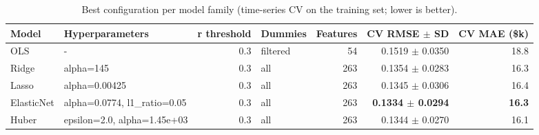 \begin{table}[t]
\centering
\small
\begin{tabular}{llrlrrr}
\toprule
Model & Hyperparameters & r threshold & Dummies & Features & CV RMSE $\pm$ SD & CV MAE (\$k) \\
\midrule
OLS & - & 0.3 & filtered & 54 & 0.1519 $\pm$ 0.0350 & 18.8 \\
Ridge & alpha=145 & 0.3 & all & 263 & 0.1354 $\pm$ 0.0283 & 16.3 \\
Lasso & alpha=0.00425 & 0.3 & all & 263 & 0.1345 $\pm$ 0.0306 & 16.4 \\
ElasticNet & alpha=0.0774, l1\_ratio=0.05 & 0.3 & all & 263 & \textbf{0.1334 $\pm$ 0.0294} & \textbf{16.3} \\
Huber & epsilon=2.0, alpha=1.45e+03 & 0.3 & all & 263 & 0.1344 $\pm$ 0.0270 & 16.1 \\
\bottomrule
\end{tabular}
\caption{Best configuration per model family (time-series CV on the training set; lower is better).}
\label{tab:best_family}
\end{table}
